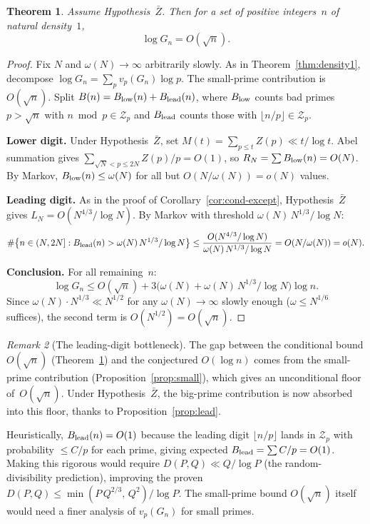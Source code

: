 \documentclass[11pt]{article}
\newtheorem{theorem}{Theorem}
\theoremstyle{definition}
\theoremstyle{remark}
\newtheorem{remark}[theorem]{Remark}
\begin{document}
\begin{theorem}\label{thm:main}
Assume Hypothesis~$\bar{Z}$. Then for a set of positive integers~$n$
of natural density~$1$,
\[
\log G_n = O(\sqrt{n}).
\]
\end{theorem}

\begin{proof}
Fix $N$ and $\omega(N) \to \infty$ arbitrarily slowly.
As in Theorem~\ref{thm:density1}, decompose
$\log G_n = \sum_p v_p(G_n)\log p$.
The small-prime contribution is $O(\sqrt{n})$.
Split $B(n) = B_{\rm low}(n) + B_{\rm lead}(n)$,
where $B_{\rm low}$ counts bad primes~$p > \sqrt{n}$
with $n \bmod p \in \mathcal{Z}_p$ and $B_{\rm lead}$
counts those with $\lfloor n/p \rfloor \in \mathcal{Z}_p$.

\textbf{Lower digit.}
Under Hypothesis~$\bar{Z}$, set
$M(t) = \sum_{p \le t} Z(p) \ll t/\log t$.
Abel summation gives
$\sum_{\sqrt{N} < p \le 2N} Z(p)/p
= O(1)$,
so $R_N = \sum B_{\rm low}(n) = O(N)$.
By Markov, $B_{\rm low}(n) \le \omega(N)$ for all but
$O(N/\omega(N)) = o(N)$ values.

\textbf{Leading digit.}
As in the proof of Corollary~\ref{cor:cond-except},
Hypothesis~$\bar{Z}$ gives $L_N = O(N^{4/3}/\log N)$.
By Markov with threshold
$\omega(N)\,N^{1/3}/\log N$:
\[
\#\bigl\{n \in (N,2N] : B_{\rm lead}(n)
> \omega(N)\,N^{1/3}/\log N\bigr\}
\le \frac{O(N^{4/3}/\log N)}%
{\omega(N)\,N^{1/3}/\log N}
= O(N/\omega(N)) = o(N).
\]

\textbf{Conclusion.}
For all remaining~$n$:
\[
\log G_n \le O(\sqrt{n})
+ 3\bigl(\omega(N)
+ \omega(N)\,N^{1/3}/\log N\bigr)\log n.
\]
Since $\omega(N) \cdot N^{1/3} \ll N^{1/2}$
for any $\omega(N) \to \infty$ slowly enough
($\omega \le N^{1/6}$ suffices),
the second term is $O(N^{1/2}) = O(\sqrt{n})$.
\end{proof}

\begin{remark}[The leading-digit bottleneck]\label{rem:leading}
The gap between the conditional bound
$O(\sqrt{n})$ (Theorem~\ref{thm:main})
and the conjectured $O(\log n)$ comes
from the small-prime contribution
(Proposition~\ref{prop:small}), which
gives an unconditional floor of~$O(\sqrt{n})$.
Under Hypothesis~$\bar{Z}$, the big-prime
contribution is now absorbed into
this floor, thanks to
Proposition~\ref{prop:lead}.

Heuristically, $B_{\rm lead}(n) = O(1)$
because the leading digit $\lfloor n/p \rfloor$
lands in $\mathcal{Z}_p$ with probability
$\le C/p$ for each prime,
giving expected $B_{\rm lead} = \sum C/p = O(1)$.
Making this rigorous
would require $D(P,Q) \ll Q/\log P$
(the random-divisibility prediction),
improving the proven
$D(P,Q) \le \min(P\,Q^{2/3},\, Q^2)/\log P$.
The small-prime bound $O(\sqrt{n})$
itself would need a finer analysis
of $v_p(G_n)$ for small primes.
\end{remark}
\end{document}
